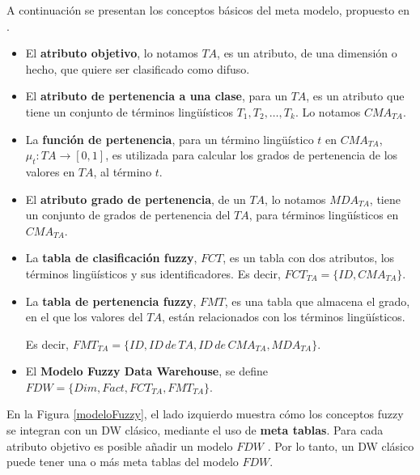\documentclass[a4paper,11pt]{article}
\begin{document}
    A continuación se presentan los conceptos básicos del meta modelo, propuesto en \cite{Fasel14}.
    
    \begin{itemize}
    
    \item El \textbf{atributo objetivo}, lo notamos $TA$, es un atributo, de una dimensión o hecho, que quiere ser clasificado como difuso.

    \item El \textbf{atributo de pertenencia a una clase}, para un $TA$, es un atributo que tiene un conjunto de términos lingüísticos
    $T_{1},T_{2}, \ldots , T_{k}$. Lo notamos $CMA_{TA}$.
    
    \item La \textbf{función de pertenencia}, para un término lingüístico $t$ en $CMA_{TA}$, $\mu_{t} : TA \rightarrow [0,1]$,
    es utilizada para calcular los grados de pertenencia de los valores en $TA$, al término $t$.

    \item El \textbf{atributo grado de pertenencia}, de un $TA$, lo notamos $MDA_{TA}$, tiene un conjunto de grados de pertenencia del $TA$,
    para términos lingüísticos en $CMA_{TA}$.
    
    \item La \textbf{tabla de clasificación fuzzy}, $FCT$, es un tabla con dos atributos, los términos lingüísticos y sus identificadores.
    Es decir, $FCT_{TA} = \{ ID, CMA_{TA} \}$.
    
    \item La \textbf{tabla de pertenencia fuzzy}, $FMT$, es una tabla que almacena el grado, en el que los valores del $TA$,
    están relacionados con los términos lingüísticos.
    
    Es decir, $FMT_{TA} = \{ ID, ID \, de \, TA, ID \, de \, CMA_{TA}, MDA_{TA} \}$.
  
    \item El \textbf{Modelo Fuzzy Data Warehouse}, se define $FDW = \{Dim, Fact, FCT_{TA}, FMT_{TA} \}$.
    
    \end{itemize}
    
    En la Figura \ref{modeloFuzzy}, el lado izquierdo muestra cómo los conceptos fuzzy se integran con un DW clásico, mediante el uso de \textbf{meta tablas}.
    Para cada atributo objetivo es posible añadir un modelo $FDW$ .
    Por lo tanto, un DW clásico puede tener una o más meta tablas del modelo $FDW$.
    
\end{document}
